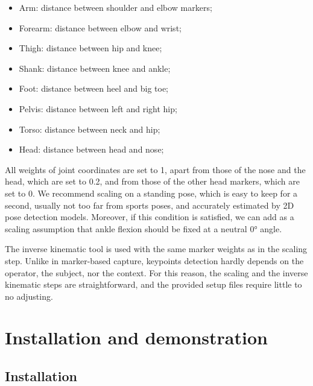 \begin{itemize}[itemsep=0em, topsep=0em, leftmargin=*]
      \item{Arm: distance between shoulder and elbow markers;}
      \item{Forearm: distance between elbow and wrist;}
      \item{Thigh: distance between hip and knee;}
      \item{Shank: distance between knee and ankle;}
      \item{Foot: distance between heel and big toe;}
      \item{Pelvis: distance between left and right hip;}
      \item{Torso: distance between neck and hip;}
      \item{Head: distance between head and nose;}
\end{itemize}
All weights of joint coordinates are set to 1, apart from those of the nose and the head, which are set to 0.2, and from those of the other head markers, which are set to 0. We recommend scaling on a standing pose, which is easy to keep for a second, usually not too far from sports poses, and accurately estimated by 2D pose detection models. Moreover, if this condition is satisfied, we can add as a scaling assumption that ankle flexion should be fixed at a neutral 0° angle. 

The inverse kinematic tool is used with the same marker weights as in the scaling step. Unlike in marker-based capture, keypoints detection hardly depends on the operator, the subject, nor the context. For this reason, the scaling and the inverse kinematic steps are straightforward, and the provided setup files require little to no adjusting.


\section{Installation and demonstration}

\subsection{Installation}

